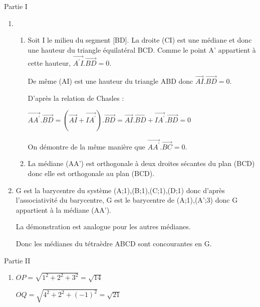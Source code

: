 \begin{corrige}
     \begin{h3} Partie I \end{h3}
     \begin{enumerate}
          \item
          \begin{enumerate}
               \item
               Soit I le milieu du segment [BD]. La droite (CI) est une médiane et donc une hauteur du triangle équilatéral BCD. Comme le point A' appartient à cette hauteur, $\overrightarrow{A^{\prime}I}.\overrightarrow{BD}=0$.
               \par
               De même (AI) est une hauteur du triangle ABD donc $\overrightarrow{AI}.\overrightarrow{BD}=0$.
               \par
               D'après la relation de Chasles :
               \par
               $\overrightarrow{AA^{\prime}}.\overrightarrow{BD}=\left(\overrightarrow{AI}+\overrightarrow{IA^{\prime}}\right).\overrightarrow{BD}=\overrightarrow{AI}.\overrightarrow{BD}+\overrightarrow{IA^{\prime}}.\overrightarrow{BD}=0$
               \par
               On démontre de la même manière que $\overrightarrow{AA^{\prime}}.\overrightarrow{BC}=0$.
               \item
               La médiane (AA') est orthogonale à deux droites sécantes du plan (BCD) donc elle est orthogonale au plan (BCD).
          \end{enumerate}
          \item
          G est la barycentre du système {(A;1),(B;1),(C;1),(D;1)} donc d'après l'associativité du barycentre, G est le barycentre de {(A;1),(A';3)} donc G appartient à la médiane (AA').
          \par
          La démonstration est analogue pour les autres médianes.
          \par
          Donc les médianes du tétraèdre ABCD sont concourantes en G.
     \end{enumerate}
     \begin{h3} Partie II \end{h3}
     \begin{enumerate}
          \item
          $OP=\sqrt{1^{2}+2^{2}+3^{2}}=\sqrt{14}$
          \par
          $OQ=\sqrt{4^{2}+2^{2}+\left(-1\right)^{2}}=\sqrt{21}$
          \par

\end{enumerate}
\end{corrige}
